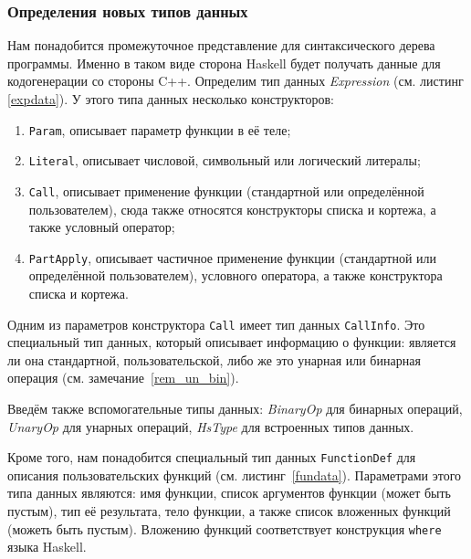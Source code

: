 		\subsubsection{Определения новых типов данных}
		Нам понадобится промежуточное представление для синтаксического дерева программы. Именно в таком виде сторона Haskell будет получать данные для кодогенерации со стороны C++. Определим тип данных \textit{Expression} (см. листинг \ref{expdata}). У этого типа данных несколько конструкторов:
		\begin{enumerate}[1)]
			\item \lstinline!Param!, описывает параметр функции в её теле;
			\item \lstinline!Literal!, описывает числовой, символьный или логический литералы;
			\item \lstinline!Call!, описывает применение функции (стандартной или определённой пользователем), сюда также относятся конструкторы списка и кортежа, а также условный оператор;
			\item \lstinline!PartApply!, описывает частичное применение функции (стандартной или определённой пользователем), условного оператора, а также конструктора списка и кортежа.			
		\end{enumerate}
		Одним из параметров конструктора \lstinline!Call! имеет тип данных \lstinline!CallInfo!. Это специальный тип данных, который описывает информацию о функции: является ли она стандартной, пользовательской, либо же это унарная или бинарная операция (см. замечание~\ref{rem_un_bin}). 
		
		Введём также вспомогательные типы данных: \textit{BinaryOp} для бинарных операций, \textit{UnaryOp} для унарных операций, \textit{HsType} для встроенных типов данных.

\label{rem_un_bin}

		Кроме того, нам понадобится специальный тип данных \lstinline!FunctionDef! для описания пользовательских функций (см. листинг~\ref{fundata}). Параметрами этого типа данных являются: имя функции, список аргументов функции (может быть пустым), тип её результата, тело функции, а также список вложенных функций (можеть быть пустым). Вложению функций соответствует конструкция \lstinline!where! языка Haskell.
		

